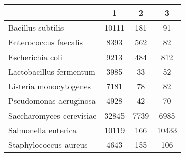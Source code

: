 \begin{adjustbox}{center}
\begin{tabular}{|l||c|c|c|}
\hline
& 1 & 2 & 3 \\
\hline
\hline
Bacillus subtilis & \cellcolor[RGB]{235, 71, 71} 10111 & \cellcolor[RGB]{237, 237, 253} 181 & \cellcolor[RGB]{232, 232, 252} 91 \\
\hline
Enterococcus faecalis & \cellcolor[RGB]{235, 71, 71} 8393 & \cellcolor[RGB]{252, 232, 232} 562 & \cellcolor[RGB]{232, 232, 252} 82 \\
\hline
Escherichia coli & \cellcolor[RGB]{235, 71, 71} 9213 & \cellcolor[RGB]{223, 223, 251} 484 & \cellcolor[RGB]{246, 246, 254} 812 \\
\hline
Lactobacillus fermentum & \cellcolor[RGB]{235, 71, 71} 3985 & \cellcolor[RGB]{218, 218, 251} 33 & \cellcolor[RGB]{255, 255, 255} 52 \\
\hline
Listeria monocytogenes & \cellcolor[RGB]{235, 71, 71} 7181 & \cellcolor[RGB]{218, 218, 251} 78 & \cellcolor[RGB]{255, 255, 255} 82 \\
\hline
Pseudomonas aeruginosa & \cellcolor[RGB]{235, 71, 71} 4928 & \cellcolor[RGB]{218, 218, 251} 42 & \cellcolor[RGB]{255, 255, 255} 70 \\
\hline
Saccharomyces cerevisiae & \cellcolor[RGB]{235, 71, 71} 32845 & \cellcolor[RGB]{252, 232, 232} 7739 & \cellcolor[RGB]{232, 232, 252} 6985 \\
\hline
Salmonella enterica & \cellcolor[RGB]{255, 255, 255} 10119 & \cellcolor[RGB]{218, 218, 251} 166 & \cellcolor[RGB]{255, 255, 255} 10433 \\
\hline
Staphylococcus aureus & \cellcolor[RGB]{235, 71, 71} 4643 & \cellcolor[RGB]{252, 232, 232} 155 & \cellcolor[RGB]{232, 232, 252} 106 \\
\hline
\end{tabular}
\end{adjustbox}
